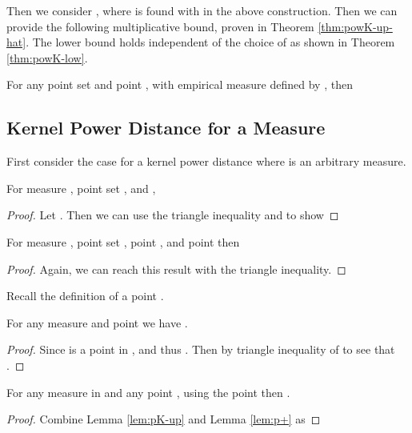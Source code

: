 \documentclass[11pt]{myclass}
\begin{document}
Then we consider , where  is found with  in the above construction.   Then we can provide the following multiplicative bound, proven in Theorem \ref{thm:powK-up-hat}.  The lower bound holds independent of the choice of  as shown in Theorem \ref{thm:powK-low}.  

\begin{theorem}
\label{thm:powK-bnd}
For any point set  and point , with empirical measure  defined by ,  then 

\end{theorem}





\subsection{Kernel Power Distance for a Measure }
First consider the case for a kernel power distance  where  is an arbitrary measure.  

\begin{theorem}
\label{thm:powK-low}
For measure , point set , and , 

\end{theorem}
\begin{proof}
Let .  Then we can use the triangle inequality and  to show

\end{proof}






\begin{lemma}
\label{lem:pK-up}
For measure , point set , point , and point   then

\end{lemma}
\begin{proof}
Again, we can reach this result with the triangle inequality. 

\end{proof}


Recall the definition of a point .  
\begin{lemma}
\label{lem:p+}
For any measure  and point  we have .  
\end{lemma}
\begin{proof}
Since  is a point in ,   and thus .  Then by triangle inequality of  to see that 
. 
\end{proof}
 
\begin{theorem}
\label{thm:powK-up}
For any measure  in  and any point , using the point  then 
.  
\end{theorem}
\begin{proof}
Combine Lemma \ref{lem:pK-up} and Lemma \ref{lem:p+} as

\end{proof}
\end{document}
